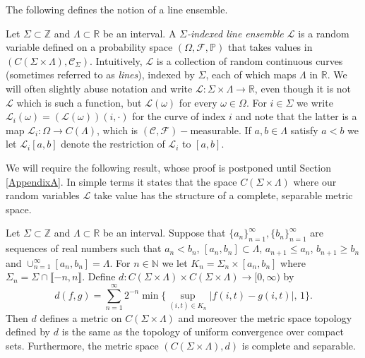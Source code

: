 The following defines the notion of a line ensemble.
\begin{definition}\label{CLEDef}
Let $\Sigma \subset \mathbb{Z}$ and $\Lambda \subset \mathbb{R}$ be an interval. A {\em $\Sigma$-indexed line ensemble $\mathcal{L}$} is a random variable defined on a probability space $(\Omega, \mathcal{F}, \mathbb{P})$ that takes values in $\left(C (\Sigma \times \Lambda), \mathcal{C}_{\Sigma}\right)$. Intuitively, $\mathcal{L}$ is a collection of random continuous curves (sometimes referred to as {\em lines}), indexed by $\Sigma$,  each of which maps $\Lambda$ in $\mathbb{R}$. We will often slightly abuse notation and write $\mathcal{L}: \Sigma \times \Lambda \rightarrow \mathbb{R}$, even though it is not $\mathcal{L}$ which is such a function, but $\mathcal{L}(\omega)$ for every $\omega \in \Omega$. For $i \in \Sigma$ we write $\mathcal{L}_i(\omega) = (\mathcal{L}(\omega))(i, \cdot)$ for the curve of index $i$ and note that the latter is a map $\mathcal{L}_i: \Omega \rightarrow C(\Lambda)$, which is $(\mathcal{C}, \mathcal{F})-$measurable. If $a,b \in \Lambda$ satisfy $a < b$ we let $\mathcal{L}_i[a,b]$ denote the restriction of $\mathcal{L}_i$ to $[a,b]$.
\end{definition}

We will require the following result, whose proof is postponed until Section \ref{AppendixA}. In simple terms it states that the space $C (\Sigma \times \Lambda)$ where our random variables $\mathcal{L}$ take value has the structure of a complete, separable metric space. 

\begin{lemma}\label{Polish} Let $\Sigma \subset \mathbb{Z}$ and $\Lambda \subset \mathbb{R}$ be an interval. Suppose that $\{a_n\}_{n = 1}^\infty, \{b_n\}_{n = 1}^\infty$ are sequences of real numbers such that $a_n < b_n$, $[a_n, b_n] \subset \Lambda$, $a_{n+1} \leq a_n$, $b_{n+1} \geq b_n$ and $\cup_{n = 1}^\infty [a_n, b_n] = \Lambda$. For $n \in \mathbb{N}$ we let $K_n = \Sigma_n \times [a_n, b_n]$ where $\Sigma_n = \Sigma \cap \llbracket -n, n \rrbracket$. Define $d: C (\Sigma \times \Lambda) \times C (\Sigma \times \Lambda) \rightarrow [0, \infty)$ by
\begin{equation} d (f,g) = \sum_{n=1}^\infty 2^{-n}\min\Big\{\sup_{(i,t)\in K_n} |f(i,t) - g(i,t)|, \, 1\Big\}.
\end{equation}
Then $d$ defines a metric on $C (\Sigma \times \Lambda) $ and moreover the metric space topology defined by $d$ is the same as the topology of uniform convergence over compact sets. Furthermore, the metric space $(C (\Sigma \times \Lambda), d)$ is complete and separable.
\end{lemma}

